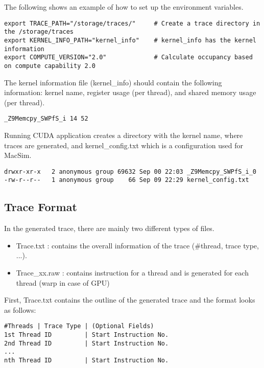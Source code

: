 The following shows an example of how to set up the environment variables.

\smallskip
\begin{lstlisting}
export TRACE_PATH="/storage/traces/"     # Create a trace directory in the /storage/traces
export KERNEL_INFO_PATH="kernel_info"    # kernel_info has the kernel information
export COMPUTE_VERSION="2.0"             # Calculate occupancy based on compute capability 2.0
\end{lstlisting}
\smallskip

The kernel information file (kernel\_info) should contain the following
information: kernel name, register usage (per thread), and shared memory usage
(per thread).

\smallskip
\begin{lstlisting}
_Z9Memcpy_SWPfS_i 14 52 
\end{lstlisting}
\smallskip

Running CUDA application creates a directory with the kernel name, where traces 
are generated, and kernel\_config.txt which is a configuration used for MacSim.

\smallskip
\begin{lstlisting}
drwxr-xr-x   2 anonymous group 69632 Sep 00 22:03 _Z9Memcpy_SWPfS_i_0
-rw-r--r--   1 anonymous group    66 Sep 09 22:29 kernel_config.txt
\end{lstlisting}
\smallskip


\subsection{Trace Format}

In the generated trace, there are mainly two different types of files.
\begin{itemize}\itemsep2pt
\item Trace.txt : contains the overall information of the trace (\#thread, trace type, ...).
\item Trace\_xx.raw : contains instruction for a thread and is generated for each thread (warp in case of GPU)
\end{itemize}

First, Trace.txt contains the outline of the generated trace and the format looks as follows: 
\smallskip
\begin{lstlisting}
#Threads | Trace Type | (Optional Fields)
1st Thread ID         | Start Instruction No.
2nd Thread ID         | Start Instruction No.
...
nth Thread ID         | Start Instruction No.
\end{lstlisting}
\smallskip

